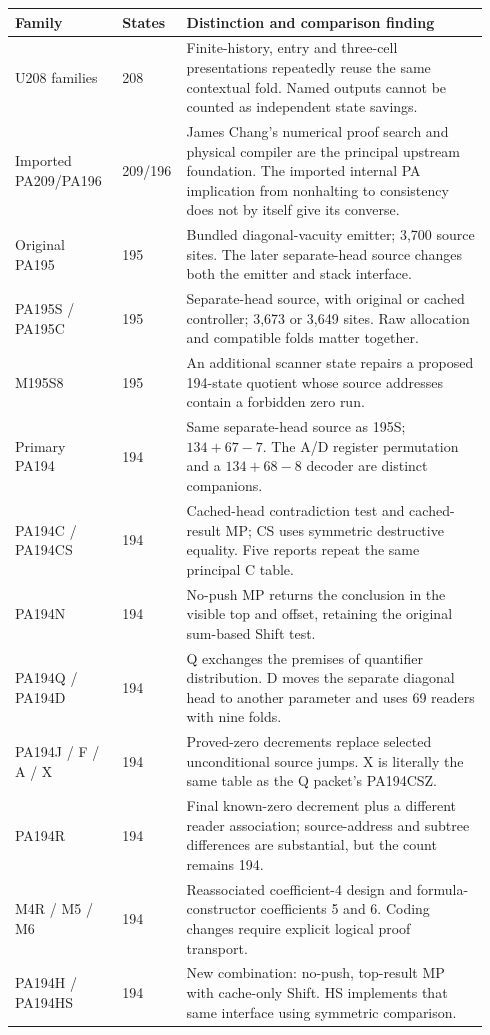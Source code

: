\documentclass[11pt,letterpaper]{article}
\begin{document}
\begin{longtable}{@{}p{0.22\linewidth}p{0.10\linewidth}p{0.62\linewidth}@{}}
\toprule Family & States & Distinction and comparison finding\\\midrule\endhead
U208 families &208&Finite-history, entry and three-cell presentations repeatedly reuse the same contextual fold. Named outputs cannot be counted as independent state savings.\\[3pt]
Imported PA209/PA196 &209/196&James Chang's numerical proof search and physical compiler are the principal upstream foundation. The imported internal PA implication from nonhalting to consistency does not by itself give its converse.\\[3pt]
Original PA195 &195&Bundled diagonal-vacuity emitter; 3,700 source sites. The later separate-head source changes both the emitter and stack interface.\\[3pt]
PA195S / PA195C &195&Separate-head source, with original or cached controller; 3,673 or 3,649 sites. Raw allocation and compatible folds matter together.\\[3pt]
M195S8 &195&An additional scanner state repairs a proposed 194-state quotient whose source addresses contain a forbidden zero run.\\[3pt]
Primary PA194 &194&Same separate-head source as 195S; $134+67-7$. The A/D register permutation and a $134+68-8$ decoder are distinct companions.\\[3pt]
PA194C / PA194CS &194&Cached-head contradiction test and cached-result MP; CS uses symmetric destructive equality. Five reports repeat the same principal C table.\\[3pt]
PA194N &194&No-push MP returns the conclusion in the visible top and offset, retaining the original sum-based Shift test.\\[3pt]
PA194Q / PA194D &194&Q exchanges the premises of quantifier distribution. D moves the separate diagonal head to another parameter and uses 69 readers with nine folds.\\[3pt]
PA194J / F / A / X &194&Proved-zero decrements replace selected unconditional source jumps. X is literally the same table as the Q packet's PA194CSZ.\\[3pt]
PA194R &194&Final known-zero decrement plus a different reader association; source-address and subtree differences are substantial, but the count remains 194.\\[3pt]
M4R / M5 / M6 &194&Reassociated coefficient-4 design and formula-constructor coefficients 5 and 6. Coding changes require explicit logical proof transport.\\[3pt]
PA194H / PA194HS &194&New combination: no-push, top-result MP with cache-only Shift. HS implements that same interface using symmetric comparison.\\
\bottomrule
\end{longtable}
\end{document}
